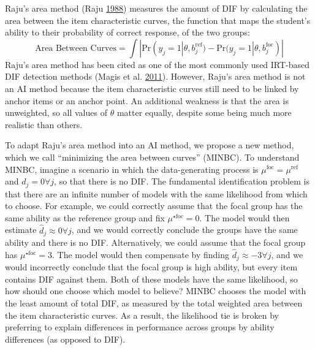 \documentclass[
  11pt,
]{article}
\begin{document}
Raju's area method (Raju \protect\hyperlink{ref-raju1988area}{1988}) measures the amount of DIF by calculating the area between the item characteristic curves, the function that maps the student's ability to their probability of correct response, of the two groups:
\[
\text{Area Between Curves} = \int |\text{Pr}(y_j = 1| \theta, b_j^{\text{ref}}) - \text{Pr}(y_j = 1| \theta, b_j^{\text{foc}})|
\]
Raju's area method has been cited as one of the most commonly used IRT-based DIF detection methods (Magis et al. \protect\hyperlink{ref-magis2011generalized}{2011}). However, Raju's area method is not an AI method because the item characteristic curves still need to be linked by anchor items or an anchor point. An additional weakness is that the area is unweighted, so all values of \(\theta\) matter equally, despite some being much more realistic than others.

To adapt Raju's area method into an AI method, we propose a new method, which we call \enquote{minimizing the area between curves} (MINBC). To understand MINBC, imagine a scenario in which the data-generating process is \(\mu^{\text{foc}} = \mu^{\text{ref}}\) and \(d_j = 0 \forall j\), so that there is no DIF. The fundamental identification problem is that there are an infinite number of models with the same likelihood from which to choose. For example, we could correctly assume that the focal group has the same ability as the reference group and fix \(\mu^{\star\text{foc}} = 0\). The model would then estimate \(\hat d_j \approx 0 \forall j\), and we would correctly conclude the groups have the same ability and there is no DIF. Alternatively, we could assume that the focal group has \(\mu^{\star\text{foc}} = 3\). The model would then compensate by finding \(\hat d_j \approx -3 \forall j\), and we would incorrectly conclude that the focal group is high ability, but every item contains DIF against them. Both of these models have the same likelihood, so how should one choose which model to believe? MINBC chooses the model with the least amount of total DIF, as measured by the total weighted area between the item characteristic curves. As a result, the likelihood tie is broken by preferring to explain differences in performance across groups by ability differences (as opposed to DIF).
\end{document}
